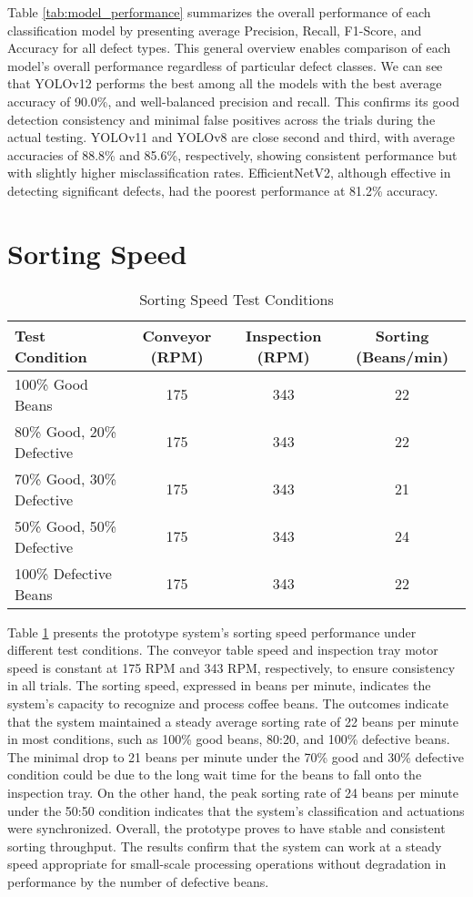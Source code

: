 Table \ref{tab:model_performance} summarizes the overall performance of each classification model by presenting average Precision, Recall, F1-Score, and Accuracy for all defect types. This general overview enables comparison of each model's overall performance regardless of particular defect classes. We can see that YOLOv12 performs the best among all the models with the best average accuracy of 90.0\%, and well-balanced precision and recall. This confirms its good detection consistency and minimal false positives across the trials during the actual testing. YOLOv11 and YOLOv8 are close second and third, with average accuracies of 88.8\% and 85.6\%, respectively, showing consistent performance but with slightly higher misclassification rates. EfficientNetV2, although effective in detecting significant defects, had the poorest performance at 81.2\% accuracy. 

\section{Sorting Speed}
\label{sec:sorting_speed}
\begin{table}[ht]
	\centering
	\small
	\caption{Sorting Speed Test Conditions}
	\label{tab:sorting_speed}
	\begin{tabularx}{\linewidth}{@{}>{\raggedright}X c c c@{}}
	\toprule
	\textbf{Test Condition} & \textbf{Conveyor (RPM)} & \textbf{Inspection (RPM)} & \textbf{Sorting (Beans/min)} \\
	\midrule
	100\% Good Beans & 175 & 343 & 22 \\
	80\% Good, 20\% Defective & 175 & 343 & 22 \\
	70\% Good, 30\% Defective & 175 & 343 & 21 \\
	50\% Good, 50\% Defective & 175 & 343 & 24 \\
	100\% Defective Beans & 175 & 343 & 22 \\
	\bottomrule
	\end{tabularx}
\end{table}
Table \ref{tab:sorting_speed} presents the prototype system's sorting speed performance under different test conditions. The conveyor table speed and inspection tray motor speed is constant at 175 RPM and 343 RPM, respectively, to ensure consistency in all trials. The sorting speed, expressed in beans per minute, indicates the system's capacity to recognize and process coffee beans. The outcomes indicate that the system maintained a steady average sorting rate of 22 beans per minute in most conditions, such as 100\% good beans, 80:20, and 100\% defective beans. The minimal drop to 21 beans per minute under the 70\% good and 30\% defective condition could be due to the long wait time for the beans to fall onto the inspection tray. On the other hand, the peak sorting rate of 24 beans per minute under the 50:50 condition indicates that the system's classification and actuations were synchronized. Overall, the prototype proves to have stable and consistent sorting throughput. The results confirm that the system can work at a steady speed appropriate for small-scale processing operations without degradation in performance by the number of defective beans.

